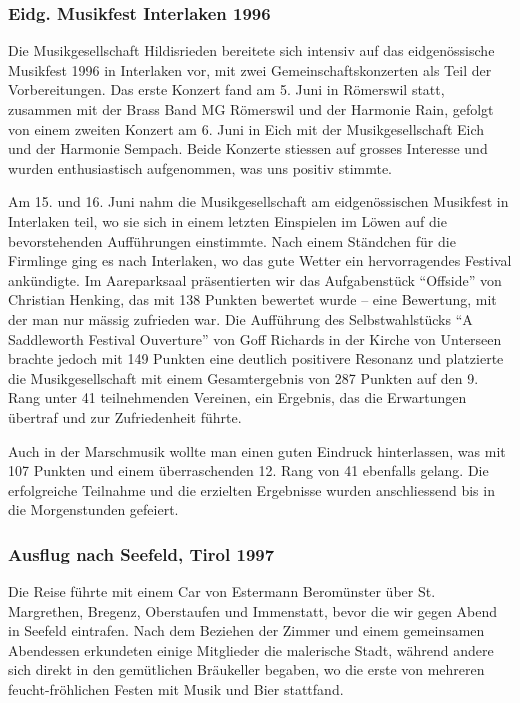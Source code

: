 \begin{history}

    \subsubsection{Eidg. Musikfest Interlaken 1996}

    Die Musikgesellschaft Hildisrieden bereitete sich intensiv auf das
    eidgenössische Musikfest 1996 in Interlaken vor, mit zwei
    Gemeinschaftskonzerten als Teil der Vorbereitungen. Das erste Konzert fand
    am 5. Juni in Römerswil statt, zusammen mit der Brass Band MG Römerswil und
    der Harmonie Rain, gefolgt von einem zweiten Konzert am 6. Juni in Eich mit
    der Musikgesellschaft Eich und der Harmonie Sempach. Beide Konzerte stiessen
    auf grosses Interesse und wurden enthusiastisch aufgenommen, was uns positiv
    stimmte.

    Am 15. und 16. Juni nahm die Musikgesellschaft am eidgenössischen Musikfest
    in Interlaken teil, wo sie sich in einem letzten Einspielen im Löwen auf die
    bevorstehenden Aufführungen einstimmte. Nach einem Ständchen für die
    Firmlinge ging es nach Interlaken, wo das gute Wetter ein hervorragendes
    Festival ankündigte. Im Aareparksaal präsentierten wir das Aufgabenstück
    \enquote{Offside} von Christian Henking, das mit 138 Punkten bewertet wurde
    -- eine Bewertung, mit der man nur mässig zufrieden war. Die Aufführung des
    Selbstwahlstücks \enquote{A Saddleworth Festival Ouverture} von Goff
    Richards in der Kirche von Unterseen brachte jedoch mit 149 Punkten eine
    deutlich positivere Resonanz und platzierte die Musikgesellschaft mit einem
    Gesamtergebnis von 287 Punkten auf den 9. Rang unter 41 teilnehmenden
    Vereinen, ein Ergebnis, das die Erwartungen übertraf und zur Zufriedenheit
    führte.

    Auch in der Marschmusik wollte man einen guten Eindruck hinterlassen, was
    mit 107 Punkten und einem überraschenden 12. Rang von 41 ebenfalls gelang.
    Die erfolgreiche Teilnahme und die erzielten Ergebnisse wurden anschliessend
    bis in die Morgenstunden gefeiert.

    \subsubsection{Ausflug nach Seefeld, Tirol 1997}

    Die Reise führte mit einem Car von Estermann Beromünster über St.
    Margrethen, Bregenz, Oberstaufen und Immenstatt, bevor die wir gegen Abend
    in Seefeld eintrafen. Nach dem Beziehen der Zimmer und einem gemeinsamen
    Abendessen erkundeten einige Mitglieder die malerische Stadt, während andere
    sich direkt in den gemütlichen Bräukeller begaben, wo die erste von mehreren
    feucht-fröhlichen Festen mit Musik und Bier stattfand.


\end{history}
